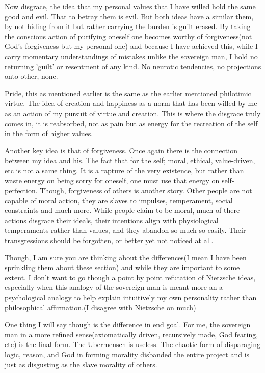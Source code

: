 \par Now disgrace, the idea that my personal values that I have willed hold the same good and evil. That to betray them is evil. But both ideas have a similar them, by not hiding from it but rather carrying the burden is guilt erased. By taking the conscious action of purifying oneself one becomes worthy of forgiveness(not God's forgiveness but my personal one) and because I have achieved this, while I carry momentary understandings of mistakes unlike the sovereign man, I hold no returning 'guilt' or resentment of any kind. No neurotic tendencies, no projections onto other, none.
\par Pride, this as mentioned earlier is the same as the earlier mentioned philotimic virtue. The idea of creation and happiness as a norm that has been willed by me as an action of my pursuit of virtue and creation. This is where the disgrace truly comes in, it is reabsorbed, not as pain but as energy for the recreation of the self in the form of higher values.
\par Another key idea is that of forgiveness. Once again there is the connection between my idea and his. The fact that for the self; moral, ethical, value-driven, etc is not a same thing. It is a rapture of the very existence, but rather than waste energy on being sorry for oneself, one must use that energy on self-perfection. Though, forgiveness of others is another story. Other people are not capable of moral action, they are slaves to impulses, temperament, social constraints and much more. While people claim to be moral, much of there actions disgrace their ideals, their intentions align with physiological temperaments rather than values, and they abandon so much so easily. Their transgressions should be forgotten, or better yet not noticed at all.
\par Though, I am sure you are thinking about the differences(I mean I have been sprinkling them about these section) and while they are important to some extent. I don't want to go though a point by point refutation of Nietzsche ideas, especially when this analogy of the sovereign man is meant more an a psychological analogy to help explain intuitively my own personality rather than philosophical affirmation.(I disagree with Nietzsche on much)
\par One thing I will say though is the difference in end goal. For me, the sovereign man in a more refined sense(axiomatically driven, recursively made, God fearing, etc) is the final form. The Ubermensch is useless. The chaotic form of disparaging logic, reason, and God in forming morality disbanded the entire project and is just as disgusting as the slave morality of others.
